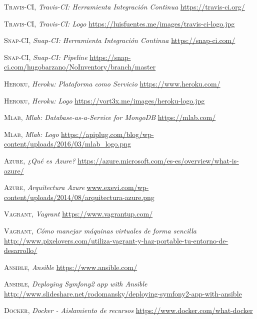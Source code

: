 \documentclass[a4paper,11pt]{book}
\begin{document}
\begin{thebibliography}{aaaa}




 \textsc{Travis-CI},
\textit{Travis-CI: Herramienta Integración Continua}
\url{https://travis-ci.org/}

 \textsc{Travis-CI},
\textit{Travis-CI: Logo}
\url{https://luisfuentes.me/images/travis-ci-logo.jpg}


 \textsc{Snap-CI},
\textit{Snap-CI: Herramienta Integración Continua}
\url{https://snap-ci.com/}

 \textsc{Snap-CI},
\textit{Snap-CI: Pipeline}
\url{https://snap-ci.com/hugobarzano/NoInventory/branch/master}


 \textsc{Heroku},
\textit{Heroku: Plataforma como Servicio}
\url{https://www.heroku.com/}

 \textsc{Heroku},
\textit{Heroku: Logo}
\url{https://vort3x.me/images/heroku-logo.jpg}

 \textsc{Mlab},
\textit{Mlab: Database-as-a-Service for MongoDB}
\url{https://mlab.com/}

 \textsc{Mlab},
\textit{Mlab: Logo}
\url{https://apiplug.com/blog/wp-content/uploads/2016/03/mlab_logo.png}



 \textsc{Azure},
\textit{¿Qué es Azure?}
\url{https://azure.microsoft.com/es-es/overview/what-is-azure/} 

 \textsc{Azure},
\textit{Arquitectura Azure}
\url{www.exevi.com/wp-content/uploads/2014/08/arquitectura-azure.png} 



 \textsc{Vagrant},
\textit{Vagrant}
\url{https://www.vagrantup.com/} 

 \textsc{Vagrant},
\textit{Cómo manejar máquinas virtuales de forma sencilla}
\url{http://www.pixelovers.com/utiliza-vagrant-y-haz-portable-tu-entorno-de-desarrollo/} 


 \textsc{Ansible},
\textit{Ansible}
\url{https://www.ansible.com/} 

 \textsc{Ansible},
\textit{Deploying Symfony2 app with Ansible}
\url{http://www.slideshare.net/rodomansky/deploying-symfony2-app-with-ansible} 


 \textsc{Docker},
\textit{Docker - Aislamiento de recursos}
\url{https://www.docker.com/what-docker} 


\end{thebibliography}
\end{document}
